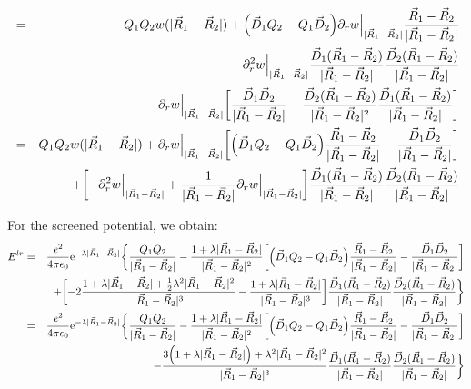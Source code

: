 \documentclass[11pt,a4paper]{report}
\begin{document}
\begin{eqnarray}
%
%
%
&=&
Q_1Q_2w(|\vec{R}_1-\vec{R}_2|)
+\Bigl(\vec{D}_1Q_2-Q_1\vec{D}_2\Bigr)
\Bigl.\partial_rw\Bigr|_{|\vec{R}_1-\vec{R}_2|}
\frac{\vec{R}_1-\vec{R}_2}{|\vec{R}_1-\vec{R}_2|}
\nonumber\\
&&
-\Bigl.\partial^2_rw\Bigr|_{|\vec{R}_1-\vec{R}_2|}
\frac{\vec{D}_1(\vec{R}_1-\vec{R}_2)}{|\vec{R}_1-\vec{R}_2|}
\frac{\vec{D}_2(\vec{R}_1-\vec{R}_2)}{|\vec{R}_1-\vec{R}_2|}
\nonumber\\
&&-
\Bigl.\partial_rw\Bigr|_{|\vec{R}_1-\vec{R}_2|}
\biggl[
\frac{\vec{D}_1\vec{D}_2}{|\vec{R}_1-\vec{R}_2|}
-
\frac{\vec{D}_2(\vec{R}_1-\vec{R}_2)}{|\vec{R}_1-\vec{R}_2|^2}
\frac{\vec{D}_1(\vec{R}_1-\vec{R}_2)}{|\vec{R}_1-\vec{R}_2|}
\biggr]
\nonumber\\
%
%
%
&=&
Q_1Q_2w(|\vec{R}_1-\vec{R}_2|)
+
\Bigl.\partial_rw\Bigr|_{|\vec{R}_1-\vec{R}_2|}
\biggl[\Bigl(\vec{D}_1Q_2-Q_1\vec{D}_2\Bigr)
\frac{\vec{R}_1-\vec{R}_2}{|\vec{R}_1-\vec{R}_2|}
-\frac{\vec{D}_1\vec{D}_2}{|\vec{R}_1-\vec{R}_2|}\biggr]
\nonumber\\
&&
+
\biggl[-\Bigl.\partial^2_rw\Bigr|_{|\vec{R}_1-\vec{R}_2|}
+\frac{1}{|\vec{R}_1-\vec{R}_2|}
\Bigl.\partial_rw\Bigr|_{|\vec{R}_1-\vec{R}_2|}
\biggr]
\frac{\vec{D}_1(\vec{R}_1-\vec{R}_2)}{|\vec{R}_1-\vec{R}_2|}
\frac{\vec{D}_2(\vec{R}_1-\vec{R}_2)}{|\vec{R}_1-\vec{R}_2|}
\end{eqnarray}

For the screened potential, we obtain:
\begin{eqnarray}
E^{lr}
&=&\frac{e^2}{4\pi\epsilon_0}\e{-\lambda|\vec{R}_1-\vec{R}_2|}
\biggl\lbrace
\frac{Q_1Q_2}{|\vec{R}_1-\vec{R}_2|}
-\frac{1+\lambda|\vec{R}_1-\vec{R}_2|}{|\vec{R}_1-\vec{R}_2|^2}
\biggl[\Bigl(\vec{D}_1Q_2-Q_1\vec{D}_2\Bigr)
\frac{\vec{R}_1-\vec{R}_2}{|\vec{R}_1-\vec{R}_2|}
-\frac{\vec{D}_1\vec{D}_2}{|\vec{R}_1-\vec{R}_2|}\biggr]
\nonumber\\
&&
+
\biggl[-2\frac{1+\lambda|\vec{R}_1-\vec{R}_2|
+\frac{1}{2}\lambda^2|\vec{R}_1-\vec{R}_2|^2}{|\vec{R}_1-\vec{R}_2|^3}
-
\frac{1+\lambda|\vec{R}_1-\vec{R}_2|}{|\vec{R}_1-\vec{R}_2|^3}
\biggr]
\frac{\vec{D}_1(\vec{R}_1-\vec{R}_2)}{|\vec{R}_1-\vec{R}_2|}
\frac{\vec{D}_2(\vec{R}_1-\vec{R}_2)}{|\vec{R}_1-\vec{R}_2|}
\biggr\rbrace
\nonumber\\
%
%
%
&=&\frac{e^2}{4\pi\epsilon_0}\e{-\lambda|\vec{R}_1-\vec{R}_2|}
\biggl\lbrace
\frac{Q_1Q_2}{|\vec{R}_1-\vec{R}_2|}
-\frac{1+\lambda|\vec{R}_1-\vec{R}_2|}{|\vec{R}_1-\vec{R}_2|^2}
\biggl[\Bigl(\vec{D}_1Q_2-Q_1\vec{D}_2\Bigr)
\frac{\vec{R}_1-\vec{R}_2}{|\vec{R}_1-\vec{R}_2|}
-\frac{\vec{D}_1\vec{D}_2}{|\vec{R}_1-\vec{R}_2|}\biggr]
\nonumber\\
&&
-
\frac{3\Bigl(1+\lambda|\vec{R}_1-\vec{R}_2|\Bigr)
+\lambda^2|\vec{R}_1-\vec{R}_2|^2}{|\vec{R}_1-\vec{R}_2|^3}
\frac{\vec{D}_1(\vec{R}_1-\vec{R}_2)}{|\vec{R}_1-\vec{R}_2|}
\frac{\vec{D}_2(\vec{R}_1-\vec{R}_2)}{|\vec{R}_1-\vec{R}_2|}
\biggr\rbrace
\end{eqnarray}
\end{document}

